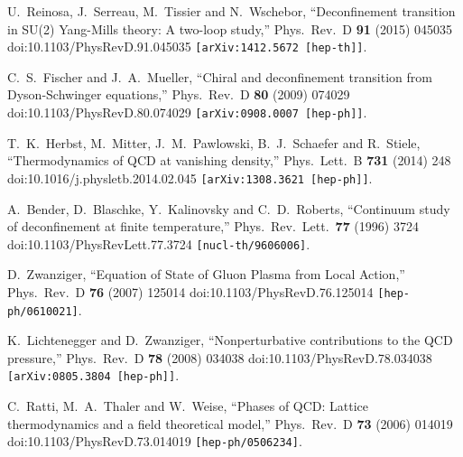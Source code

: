 \documentclass[a4paper,11pt,british,twosides]{book}%
\numberwithin{equation}{section}
\begin{document}
\begin{thebibliography}{9}
  U.~Reinosa, J.~Serreau, M.~Tissier and N.~Wschebor,
  ``Deconfinement transition in SU(2) Yang-Mills theory: A two-loop study,''
  Phys.\ Rev.\ D {\bf 91} (2015) 045035
  doi:10.1103/PhysRevD.91.045035
  {\tt [arXiv:1412.5672 [hep-th]]}.

  C.~S.~Fischer and J.~A.~Mueller,
  ``Chiral and deconfinement transition from Dyson-Schwinger equations,''
  Phys.\ Rev.\ D {\bf 80} (2009) 074029
  doi:10.1103/PhysRevD.80.074029
  {\tt [arXiv:0908.0007 [hep-ph]]}.

  T.~K.~Herbst, M.~Mitter, J.~M.~Pawlowski, B.~J.~Schaefer and R.~Stiele,
  ``Thermodynamics of QCD at vanishing density,''
  Phys.\ Lett.\ B {\bf 731} (2014) 248
  doi:10.1016/j.physletb.2014.02.045
  {\tt [arXiv:1308.3621 [hep-ph]]}.

  A.~Bender, D.~Blaschke, Y.~Kalinovsky and C.~D.~Roberts,
  ``Continuum study of deconfinement at finite temperature,''
  Phys.\ Rev.\ Lett.\  {\bf 77} (1996) 3724
  doi:10.1103/PhysRevLett.77.3724
  {\tt [nucl-th/9606006]}.

  D.~Zwanziger,
  ``Equation of State of Gluon Plasma from Local Action,''
  Phys.\ Rev.\ D {\bf 76} (2007) 125014
  doi:10.1103/PhysRevD.76.125014
  {\tt [hep-ph/0610021]}.

  K.~Lichtenegger and D.~Zwanziger,
  ``Nonperturbative contributions to the QCD pressure,''
  Phys.\ Rev.\ D {\bf 78} (2008) 034038
  doi:10.1103/PhysRevD.78.034038
  {\tt [arXiv:0805.3804 [hep-ph]]}.

  C.~Ratti, M.~A.~Thaler and W.~Weise,
  ``Phases of QCD: Lattice thermodynamics and a field theoretical model,''
  Phys.\ Rev.\ D {\bf 73} (2006) 014019
  doi:10.1103/PhysRevD.73.014019
  {\tt [hep-ph/0506234]}.


\end{thebibliography}
\end{document}
